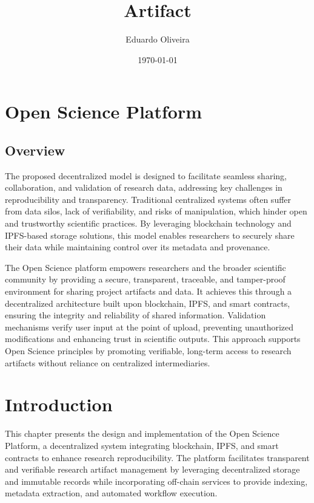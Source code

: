 \documentclass{article}
\title{Artifact}
\author{Eduardo Oliveira}
\date{\today}
\begin{document}
\maketitle

\section{Open Science Platform}

\subsection{Overview}

The proposed decentralized model is designed to facilitate seamless sharing, collaboration, and validation of research data, addressing key challenges in reproducibility and transparency. Traditional centralized systems often suffer from data silos, lack of verifiability, and risks of manipulation, which hinder open and trustworthy scientific practices. By leveraging blockchain technology and IPFS-based storage solutions, this model enables researchers to securely share their data while maintaining control over its metadata and provenance.

The Open Science platform empowers researchers and the broader scientific community by providing a secure, transparent, traceable, and tamper-proof environment for sharing project artifacts and data. It achieves this through a decentralized architecture built upon blockchain, IPFS, and smart contracts, ensuring the integrity and reliability of shared information. Validation mechanisms verify user input at the point of upload, preventing unauthorized modifications and enhancing trust in scientific outputs. This approach supports Open Science principles by promoting verifiable, long-term access to research artifacts without reliance on centralized intermediaries.



\section{Introduction}
This chapter presents the design and implementation of the Open Science Platform, a decentralized system integrating blockchain, IPFS, and smart contracts to enhance research reproducibility. The platform facilitates transparent and verifiable research artifact management by leveraging decentralized storage and immutable records while incorporating off-chain services to provide indexing, metadata extraction, and automated workflow execution.
\end{document}

